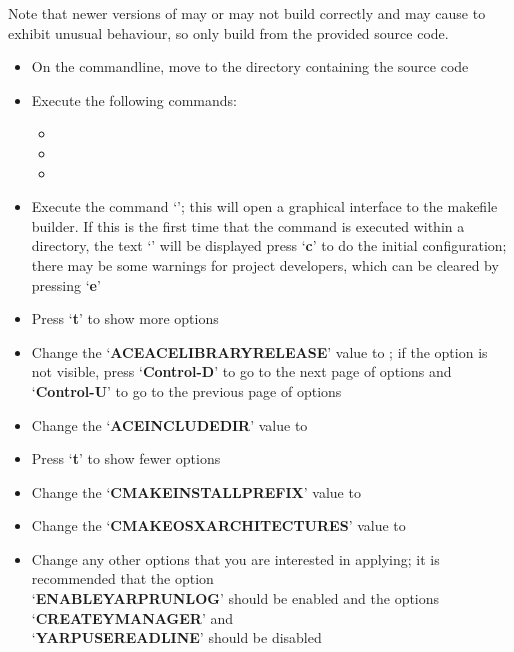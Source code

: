 Note that newer versions of \yarp{} may or may not build correctly and may cause
\mplusm{} to exhibit unusual behaviour, so only build \yarp{} from the provided
source code.
\begin{itemize}
\item On the command\longDash{}line, move to the directory containing the \yarp{} source
code \longDash{} 
\item\exSp{}Execute the following commands:
\begin{itemize}
\item {}
\item\exSp{}
\item\exSp{}
\end{itemize}
\item\exSp{}Execute the command `'; this will open a graphical
interface to the makefile builder. If this is the first time that the command is executed
within a directory, the text `' will be displayed \longDash{} press
`\textbf{c}' to do the initial configuration; there may be some warnings for project
developers, which can be cleared by pressing `\textbf{e}'
\item\exSp{}Press `\textbf{t}' to show more options
\item\exSp{}Change the `\textbf{ACE\fUS{}ACE\fUS{}LIBRARY\fUS{}RELEASE}' value to
; if the option is not visible, press
`\textbf{Control-D}' to go to the next page of options and `\textbf{Control-U}' to go to
the previous page of options
\item\exSp{}Change the `\textbf{ACE\fUS{}INCLUDE\fUS{}DIR}' value to
\item\exSp{}Press `\textbf{t}' to show fewer options
\item\exSp{}Change the `\textbf{CMAKE\fUS{}INSTALL\fUS{}PREFIX}' value to
\item\exSp{}Change the `\textbf{CMAKE\fUS{}OSX\fUS{}ARCHITECTURES}' value to
\item\exSp{}Change any other options that you are interested in applying; it is
recommended that the option\\
`\textbf{ENABLE\fUS{}YARPRUN\fUS{}LOG}' should be enabled and the options
`\textbf{CREATE\fUS{}YMANAGER}' and\\
`\textbf{YARP\fUS{}USE\fUS{}READLINE}' should be disabled

\end{itemize}
